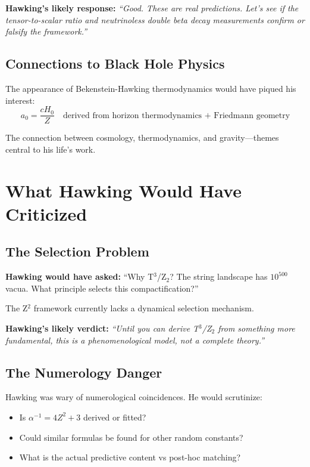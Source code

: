 \documentclass[12pt,a4paper]{article}
\begin{document}
\textbf{Hawking's likely response:} \textit{``Good. These are real predictions. Let's see if the tensor-to-scalar ratio and neutrinoless double beta decay measurements confirm or falsify the framework.''}

\subsection{Connections to Black Hole Physics}

The appearance of Bekenstein-Hawking thermodynamics would have piqued his interest:
\begin{equation}
a_0 = \frac{cH_0}{Z} \quad \text{derived from horizon thermodynamics + Friedmann geometry}
\end{equation}

The connection between cosmology, thermodynamics, and gravity---themes central to his life's work.

\section{What Hawking Would Have Criticized}

\subsection{The Selection Problem}

\textbf{Hawking would have asked:} ``Why T$^3$/Z$_2$? The string landscape has $10^{500}$ vacua. What principle selects this compactification?''

The Z$^2$ framework currently lacks a dynamical selection mechanism.

\textbf{Hawking's likely verdict:} \textit{``Until you can derive T$^3$/Z$_2$ from something more fundamental, this is a phenomenological model, not a complete theory.''}

\subsection{The Numerology Danger}

Hawking was wary of numerological coincidences. He would scrutinize:
\begin{itemize}
\item Is $\alpha^{-1} = 4Z^2 + 3$ derived or fitted?
\item Could similar formulas be found for other random constants?
\item What is the actual predictive content vs post-hoc matching?
\end{itemize}
\end{document}
